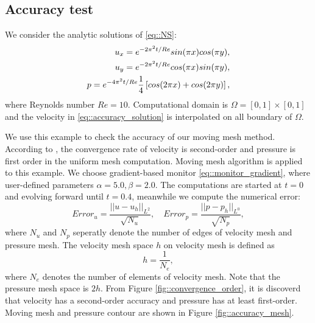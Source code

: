\documentclass[mathpazo]{aamm}
\begin{document}
     \subsection{Accuracy test}
       We consider the analytic solutions of \eqref{eq::NS}:
       \begin{eqnarray}
         u_x = e^{-2 \pi^2 t / Re} sin(\pi x) cos(\pi y),  \notag\\ 
         u_y = e^{-2 \pi^2 t / Re} cos(\pi x) sin(\pi y), \\ 
         p = e^{-4 \pi^2 t / Re} \frac{1}{4}\left [ cos(2 \pi x) +
           cos(2 \pi y) \right ], \notag
       \label{eq::accuracy_solution}
       \end{eqnarray}
       where Reynolds number  $Re = 10$. Computational domain is
       $\Omega = [0, 1]\times[0, 1]$ and the velocity
       in \eqref{eq::accuracy_solution} is interpolated on all
       boundary of $\Omega$.
       
       We use this example to check the accuracy of our moving mesh
       method. According to \cite{bercovier1979error}, the convergence
       rate of velocity is second-order and pressure is first
       order in the uniform mesh computation. Moving mesh algorithm is
       applied to this example. We choose gradient-based monitor
       \eqref{eq::monitor_gradient}, where user-defined parameters
       $\alpha = 5.0, \beta = 2.0$. The computations are started at $t
       = 0$ and evolving forward
       until $t = 0.4$, meanwhile we compute the numerical error: 
       \begin{equation}
         Error_u = \frac{|| u - u_h||_{L^2}}{\sqrt{N_u}},\quad
         Error_p = \frac{||p - p_h||_{L^0}}{\sqrt{N_p}}, 
       \end{equation}
       where $N_u$ and $N_p$ seperatly denote the number of edges
       of velocity mesh and pressure mesh. The velocity mesh space $h$ on velocity
       mesh is defined as 
       \begin{equation}
         h = \frac{1}{N_e},
       \end{equation}
       where $N_e$ denotes the number of elements of velocity
       mesh. Note that the pressure mesh space is $2h$.
       From Figure \ref{fig::convergence_order}, it is discoverd that
       velocity has a second-order accuracy and pressure has at least
       first-order. Moving mesh and pressure contour are shown in
       Figure \ref{fig::accuracy_mesh}.
\end{document}
